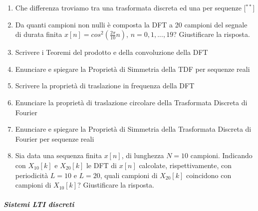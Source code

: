 \documentclass[
]{article}
\providecommand{\tightlist}{%
  \setlength{\itemsep}{0pt}\setlength{\parskip}{0pt}}
\begin{document}
\begin{enumerate}
\def\labelenumi{\arabic{enumi}.}
\setcounter{enumi}{21}
\tightlist
\item
  Che differenza troviamo tra una trasformata discreta ed una per
  sequenze {[}\(^{**}\){]}
\item
  Da quanti campioni non nulli è composta la DFT a 20 campioni del
  segnale di durata finita \(x[n] = cos^2(\frac{2\pi}{10}n)\),
  \(n = 0, 1, . . . , 19\)? Giustificare la risposta.
\item
  Scrivere i Teoremi del prodotto e della convoluzione della DFT
\item
  Enunciare e spiegare la Proprietà di Simmetria della TDF per sequenze
  reali
\item
  Scrivere la proprietà di traslazione in frequenza della DFT
\item
  Enunciare la proprietà di traslazione circolare della Trasformata
  Discreta di Fourier
\item
  Enunciare e spiegare la Proprietà di Simmetria della Trasformata
  Discreta di Fourier per sequenze reali
\item
  Sia data una sequenza finita \(x[n]\), di lunghezza \(N = 10\)
  campioni. Indicando con \(X_{10}[k]\) e \(X_{20}[k]\) le DFT di
  \(x[n]\) calcolate, rispettivamente, con periodicità \(L = 10\) e
  \(L = 20\), quali campioni di \(X_{20}[k]\) coincidono con campioni di
  \(X_{10}[k]\)? Giustificare la risposta.
\end{enumerate}

\subparagraph{Sistemi LTI discreti}\label{sistemi-lti-discreti}
\end{document}
